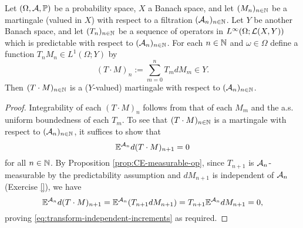 \begin{prop}\label{prop:mgale-transforms}
  Let $(\Omega, \mathcal{A}, \mathbb{P})$ be a probability space, $X$ a Banach space, and let $(M_n)_{n \in \mathbb{N}}$ be a martingale (valued in $X$) with respect to a filtration $(\mathcal{A}_n)_{n \in \mathbb{N}}$.
  Let $Y$ be another Banach space, and let $(T_n)_{n \in \mathbb{N}}$ be a sequence of operators in $L^\infty(\Omega; \mathcal{L}(X,Y))$ which is predictable with respect to $(\mathcal{A}_n)_{n \in \mathbb{N}}$.
  For each $n \in \mathbb{N}$ and $\omega \in \Omega$ define a function $T_n M_n \in L^1(\Omega; Y)$ by
  \begin{equation*}
    (T \cdot M)_n := \sum_{m=0}^n T_m dM_m \in Y.
  \end{equation*}
  Then $(T \cdot M)_{n \in \mathbb{N}}$ is a ($Y$-valued) martingale with respect to $(\mathcal{A}_n)_{n \in \mathbb{N}}$.
\end{prop}

\begin{proof}
  Integrability of each $(T \cdot M)_n$ follows from that of each $M_m$ and the a.s. uniform boundedness of each $T_m$.
  To see that $(T \cdot M)_{n \in \mathbb{N}}$ is a martingale with respect to $(\mathcal{A}_n)_{n \in \mathbb{N}}$, it suffices to show that
  \begin{equation}\label{eq:transform-independent-increments}
    \mathbb{E}^{\mathcal{A}_n} d(T \cdot M)_{n+1} = 0
  \end{equation}
  for all $n \in \mathbb{N}$.
  By Proposition \ref{prop:CE-measurable-op}, since $T_{n+1}$ is $\mathcal{A}_n$-measurable by the predictability assumption and $dM_{n+1}$ is independent of $\mathcal{A}_n$ (Exercise \ref{}), we have 
  \begin{equation*}
    \mathbb{E}^{\mathcal{A}_n} d(T \cdot M)_{n+1} = \mathbb{E}^{\mathcal{A}_n} (T_{n+1} dM_{n+1}) = T_{n+1} \mathbb{E}^{\mathcal{A}_n} dM_{n+1} = 0,
  \end{equation*}
  proving \eqref{eq:transform-independent-increments} as required.
\end{proof}

